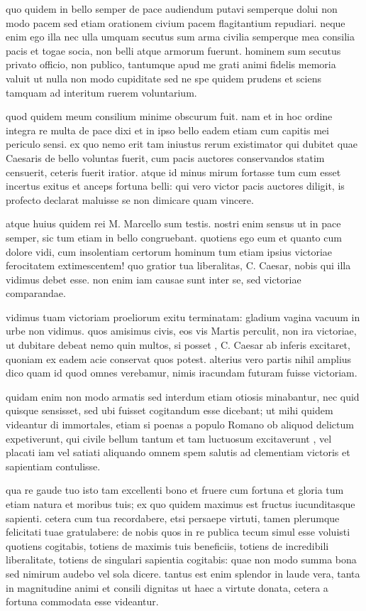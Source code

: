  quo quidem in bello semper de pace audiendum putavi semperque dolui non modo pacem sed etiam orationem civium pacem flagitantium repudiari. neque enim ego illa nec ulla umquam secutus sum arma civilia semperque mea consilia pacis et togae socia, non belli atque armorum fuerunt. hominem sum secutus privato officio, non publico, tantumque apud me grati animi fidelis memoria valuit ut nulla non modo cupiditate sed ne spe quidem prudens et sciens tamquam ad interitum ruerem voluntarium.

 quod quidem meum consilium minime obscurum fuit. nam et in hoc ordine integra re multa de pace dixi et in ipso bello eadem etiam cum capitis mei periculo sensi. ex quo nemo erit tam iniustus rerum existimator qui dubitet quae Caesaris de bello voluntas fuerit, cum pacis auctores conservandos statim censuerit, ceteris fuerit iratior. atque id minus mirum fortasse tum cum esset incertus exitus et anceps fortuna belli: qui vero victor pacis auctores diligit, is profecto declarat maluisse se non dimicare quam vincere.

 atque huius quidem rei M. Marcello sum testis. nostri enim sensus ut in pace semper, sic tum etiam in bello congruebant. quotiens ego eum et quanto cum dolore vidi, cum insolentiam certorum hominum tum etiam ipsius victoriae ferocitatem extimescentem! quo gratior tua liberalitas, C. Caesar, nobis qui illa vidimus debet esse. non enim iam causae sunt inter se, sed victoriae comparandae.

 vidimus tuam victoriam proeliorum exitu terminatam: gladium vagina vacuum in urbe non vidimus. quos amisimus civis, eos vis Martis perculit, non ira victoriae, ut dubitare debeat nemo quin multos, si posset , C. Caesar ab inferis excitaret, quoniam ex eadem acie conservat quos potest. alterius vero partis nihil amplius dico quam id quod omnes verebamur, nimis iracundam futuram fuisse victoriam.

 quidam enim non modo armatis sed interdum etiam otiosis minabantur, nec quid quisque sensisset, sed ubi fuisset cogitandum esse dicebant; ut mihi quidem videantur di immortales, etiam si poenas a populo Romano ob aliquod delictum expetiverunt, qui civile bellum tantum et tam luctuosum excitaverunt , vel placati iam vel satiati aliquando omnem spem salutis ad clementiam victoris et sapientiam contulisse.

 qua re gaude tuo isto tam excellenti bono et fruere cum fortuna et gloria tum etiam natura et moribus tuis; ex quo quidem maximus est fructus iucunditasque sapienti. cetera cum tua recordabere, etsi persaepe virtuti, tamen plerumque felicitati tuae gratulabere: de nobis quos in re publica tecum simul esse voluisti quotiens cogitabis, totiens de maximis tuis beneficiis, totiens de incredibili liberalitate, totiens de singulari sapientia cogitabis: quae non modo summa bona sed nimirum audebo vel sola dicere. tantus est enim splendor in laude vera, tanta in magnitudine animi et consili dignitas ut haec a virtute donata, cetera a fortuna commodata esse videantur.

